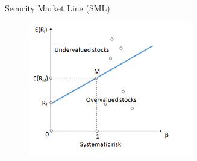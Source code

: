 \documentclass{beamer}
\begin{document}
\begin{frame}{Security Market Line (SML)}
    \begin{figure}[h]
        \centering
        \includegraphics[width=\textwidth]{SML.png}
    \end{figure}
\end{frame}
\end{document}
